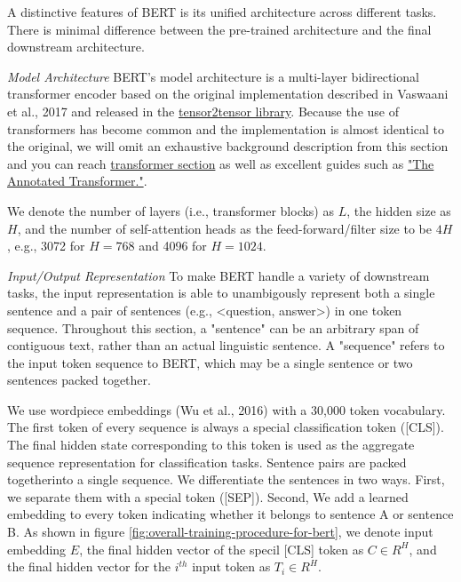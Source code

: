 \documentclass{report}
\begin{document}
A distinctive features of BERT is its unified architecture across different tasks. There is minimal difference between the pre-trained architecture and the final downstream architecture.

\textit{Model Architecture}
BERT's model architecture is a multi-layer bidirectional transformer encoder based on the original implementation described in Vaswaani et al., 2017 and released in the \href{https://github.com/tensorflow/tensor2tensor}{tensor2tensor library}. Because the use of transformers has become common and the implementation is almost identical to the original, we will omit an exhaustive background description from this section and you can reach \hyperref[sec:transformer]{transformer section} as well as excellent guides such as \href{http://nlp.seas.harvard.edu/2018/04/03/attention.html}{"The Annotated Transformer."}.

We denote the number of layers (i.e., transformer blocks) as $L$, the hidden size as $H$, and the number of self-attention heads as the feed-forward/filter size to be $4H$, e.g., 3072 for $H=768$ and 4096 for $H=1024$. 

\textit{Input/Output Representation}
To make BERT handle a variety of downstream tasks, the input representation is able to unambigously represent both a single sentence and a pair of sentences (e.g., <question, answer>) in one token sequence. Throughout this section, a "sentence" can be an arbitrary span of contiguous text, rather than an actual linguistic sentence. A "sequence" refers to the input token sequence to BERT, which may be a single sentence or two sentences packed together.

We use wordpiece embeddings (Wu et al., 2016) with a 30,000 token vocabulary. The first token of every sequence is always a special classification token ([CLS]). The final hidden state corresponding to this token is used as the aggregate sequence representation for classification tasks. Sentence pairs are packed togetherinto a single sequence. We differentiate the sentences in two ways. First, we separate them with a special token ([SEP]). Second, We add a learned embedding to every token indicating whether it belongs to sentence A or sentence B. As shown in figure \ref{fig:overall-training-procedure-for-bert}, we denote input embedding $E$, the final hidden vector of the specil [CLS] token as $C \in R^H$, and the final hidden vector for the $i^{th}$ input token as $T_i \in R^H$.
\end{document}
